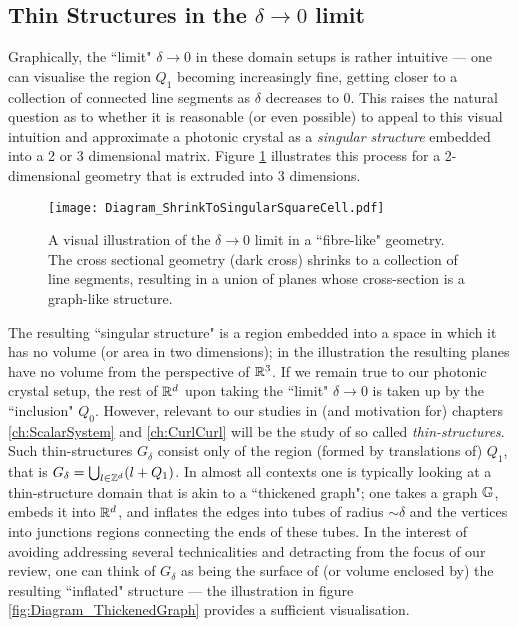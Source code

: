 \subsection{Thin Structures in the $\delta\rightarrow0$ limit} \label{ssec:Intro-ThinStructures}

Graphically, the ``limit" $\delta\rightarrow0$ in these domain setups is rather intuitive --- one can visualise the region $Q_1$ becoming increasingly fine, getting closer to a collection of connected line segments as $\delta$ decreases to 0.
This raises the natural question as to whether it is reasonable (or even possible) to appeal to this visual intuition and approximate a photonic crystal as a \emph{singular structure} embedded into a 2 or 3 dimensional matrix.
Figure \ref{fig:Diagram_ShrinkToSingularSquareCell} illustrates this process for a 2-dimensional geometry that is extruded into 3 dimensions.
\begin{figure}[h]
	\centering
	\texttt{[image: Diagram\_ShrinkToSingularSquareCell.pdf]}
	\caption[Visual illustration of the singular limit of a thin-structure geometry.]{\label{fig:Diagram_ShrinkToSingularSquareCell} A visual illustration of the $\delta\rightarrow0$ limit in a ``fibre-like" geometry. The cross sectional geometry (dark cross) shrinks to a collection of line segments, resulting in a union of planes whose cross-section is a graph-like structure.}
\end{figure}
The resulting ``singular structure" is a region embedded into a space in which it has no volume (or area in two dimensions); in the illustration the resulting planes have no volume from the perspective of $\mathbb{R}^3$.
If we remain true to our photonic crystal setup, the rest of $\mathbb{R}^d$ upon taking the ``limit" $\delta\rightarrow0$ is taken up by the ``inclusion" $Q_0$.
However, relevant to our studies in (and motivation for) chapters \ref{ch:ScalarSystem} and \ref{ch:CurlCurl} will be the study of so called \emph{thin-structures}.
Such thin-structures $G_{\delta}$ consist only of the region (formed by translations of) $Q_1$, that is $G_{\delta} = \bigcup_{l\in\mathbb{Z}^d}(l+Q_1)$.
In almost all contexts one is typically looking at a thin-structure domain that is akin to a ``thickened graph"; one takes a graph $\mathbb{G}$, embeds it into $\mathbb{R}^d$, and inflates the edges into tubes of radius $\sim\delta$ and the vertices into junctions regions connecting the ends of these tubes.
In the interest of avoiding addressing several technicalities and detracting from the focus of our review, one can think of $G_{\delta}$ as being the surface of (or volume enclosed by) the resulting ``inflated" structure --- the illustration in figure \ref{fig:Diagram_ThickenedGraph} provides a sufficient visualisation.
